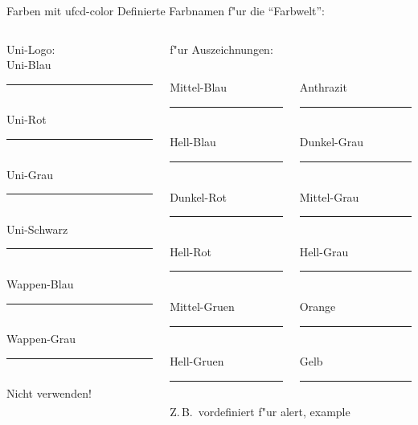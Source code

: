 \documentclass[german,english,mainlanguage=german]{beamer}
\begin{document}
\begin{frame}{Farben mit ufcd-color}
  Definierte Farbnamen f"ur die \enquote{Farbwelt}:
  \begin{columns}[t]
  \begin{column}{3cm}
    Uni-Logo:\\
     Uni-Blau {\color{Uni-Blau}\rule{0.8em}{0.8em}}\\
     Uni-Rot {\color{Uni-Rot}\rule{0.8em}{0.8em}}\\
     Uni-Grau {\color{Uni-Grau}\rule{0.8em}{0.8em}}\\
     Uni-Schwarz {\color{Uni-Schwarz}\rule{0.8em}{0.8em}}\\
     Wappen-Blau {\color{Wappen-Blau}\rule{0.8em}{0.8em}}\\
     Wappen-Grau {\color{Wappen-Grau}\rule{0.8em}{0.8em}}\\
    \alert{Nicht verwenden!}
  \end{column}
  \begin{column}{6.6cm}
   f"ur Auszeichnungen:
  \begin{columns}[t]
  \begin{column}{3cm}
     Mittel-Blau {\color{Mittel-Blau}\rule{0.8em}{0.8em}}\\
     Hell-Blau {\color{Hell-Blau}\rule{0.8em}{0.8em}}\\
     Dunkel-Rot {\color{Dunkel-Rot}\rule{0.8em}{0.8em}}\\
     Hell-Rot {\color{Hell-Rot}\rule{0.8em}{0.8em}}\\
     Mittel-Gruen {\color{Mittel-Gruen}\rule{0.8em}{0.8em}}\\
     Hell-Gruen {\color{Hell-Gruen}\rule{0.8em}{0.8em}}
  \end{column}
  \begin{column}{2.8cm}
     Anthrazit {\color{Anthrazit}\rule{0.8em}{0.8em}}\\
     Dunkel-Grau {\color{Dunkel-Grau}\rule{0.8em}{0.8em}}\\
     Mittel-Grau {\color{Mittel-Grau}\rule{0.8em}{0.8em}}\\
     Hell-Grau {\color{Hell-Grau}\rule{0.8em}{0.8em}}\\
     Orange {\color{Orange}\rule{0.8em}{0.8em}}\\
     Gelb {\color{Gelb}\rule{0.8em}{0.8em}}\strut
  \end{column}
  \end{columns}

Z.\,B.\ vordefiniert f"ur \alert{alert}, example
  \end{column}
  \end{columns}

\end{frame}
\end{document}
